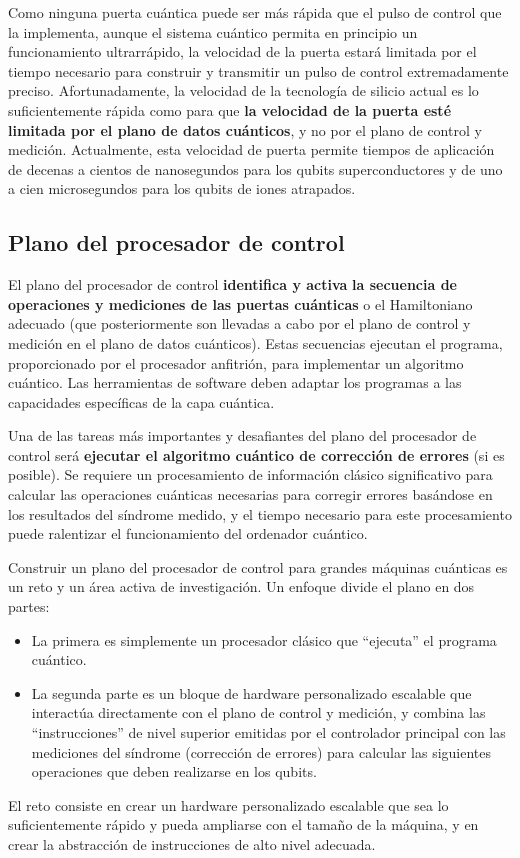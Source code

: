Como ninguna puerta cuántica puede ser más rápida que el pulso de control que la implementa, aunque el sistema cuántico permita en principio un funcionamiento ultrarrápido, la velocidad de la puerta estará limitada por el tiempo necesario para construir y transmitir un pulso de control extremadamente preciso. Afortunadamente, la velocidad de la tecnología de silicio actual es lo suficientemente rápida como para que \textbf{la velocidad de la puerta esté limitada por el plano de datos cuánticos}, y no por el plano de control y medición. Actualmente, esta velocidad de puerta permite tiempos de aplicación de  decenas a cientos de nanosegundos para los qubits superconductores y de uno a cien microsegundos para los qubits de iones atrapados.



	
	\subsection{Plano del procesador de control}

El plano del procesador de control \textbf{identifica y activa} \textbf{la secuencia de operaciones y mediciones de las puertas cuánticas} o el Hamiltoniano adecuado (que posteriormente son llevadas a cabo por el plano de control y medición en el plano de datos cuánticos). Estas secuencias ejecutan el programa, proporcionado por el procesador anfitrión, para implementar un algoritmo cuántico. Las herramientas de software deben adaptar los programas a las capacidades específicas de la capa cuántica.

Una de las tareas más importantes y desafiantes del plano del procesador de control será \textbf{ejecutar el algoritmo cuántico de corrección de errores} (si es posible). Se requiere un procesamiento de información clásico significativo para calcular las operaciones cuánticas necesarias para corregir errores basándose en los resultados del síndrome medido, y el tiempo necesario para este procesamiento puede ralentizar el funcionamiento del ordenador cuántico. 

Construir un plano del procesador de control para grandes máquinas cuánticas es un reto y un área activa de investigación. Un enfoque divide el plano en dos partes:
\begin{itemize}
\item La primera es simplemente un procesador clásico que ``ejecuta'' el programa cuántico.
\item La segunda parte es un bloque de hardware personalizado escalable que interactúa directamente con el plano de control y medición, y combina las ``instrucciones'' de nivel superior emitidas por el controlador principal con las mediciones del síndrome (corrección de errores) para calcular las siguientes operaciones que deben realizarse en los qubits.
\end{itemize}
El reto consiste en crear un hardware personalizado escalable que sea lo suficientemente rápido y pueda ampliarse con el tamaño de la máquina, y en crear la abstracción de instrucciones de alto nivel adecuada.

